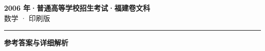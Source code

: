 \documentclass[zihao=5, a4paper]{ctexart}
\begin{document}
\begin{center}
  {\Large\bfseries 2006 年·普通高等学校招生考试·福建卷文科}\\[4pt]
  {\large 数学 · 印刷版}
\end{center}
\medskip
{}

\par\bigskip\hrule\bigskip
{}
\begin{center}{\large\bfseries 参考答案与详细解析}\end{center}
\smallskip

\end{document}
